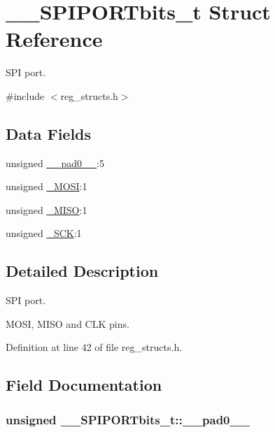 \hypertarget{struct_____s_p_i_p_o_r_tbits__t}{\section{\-\_\-\-\_\-\-S\-P\-I\-P\-O\-R\-Tbits\-\_\-t Struct Reference}
\label{struct_____s_p_i_p_o_r_tbits__t}
}


S\-P\-I port.  




{\ttfamily \#include $<$reg\-\_\-structs.\-h$>$}

\subsection*{Data Fields}
\begin{DoxyCompactItemize}
\item 
unsigned \hyperlink{struct_____s_p_i_p_o_r_tbits__t_adaa7058ebdf3984a666270efbbd35783}{\-\_\-\-\_\-pad0\-\_\-\-\_\-}\-:5
\item 
unsigned \hyperlink{struct_____s_p_i_p_o_r_tbits__t_aad271e40e94776c0c0b4c69573527867}{\-\_\-\-M\-O\-S\-I}\-:1
\item 
unsigned \hyperlink{struct_____s_p_i_p_o_r_tbits__t_a495a90d64370d78287cb8ab826e3822e}{\-\_\-\-M\-I\-S\-O}\-:1
\item 
unsigned \hyperlink{struct_____s_p_i_p_o_r_tbits__t_af5db81645a0530bcbb7321f2e5664209}{\-\_\-\-S\-C\-K}\-:1
\end{DoxyCompactItemize}


\subsection{Detailed Description}
S\-P\-I port. 

M\-O\-S\-I, M\-I\-S\-O and C\-L\-K pins. 

Definition at line 42 of file reg\-\_\-structs.\-h.



\subsection{Field Documentation}
\hypertarget{struct_____s_p_i_p_o_r_tbits__t_adaa7058ebdf3984a666270efbbd35783}{
\subsubsection[{\-\_\-\-\_\-pad0\-\_\-\-\_\-}]{\setlength{\rightskip}{0pt plus 5cm}unsigned \-\_\-\-\_\-\-S\-P\-I\-P\-O\-R\-Tbits\-\_\-t\-::\-\_\-\-\_\-pad0\-\_\-\-\_\-}}\label{struct_____s_p_i_p_o_r_tbits__t_adaa7058ebdf3984a666270efbbd35783}


